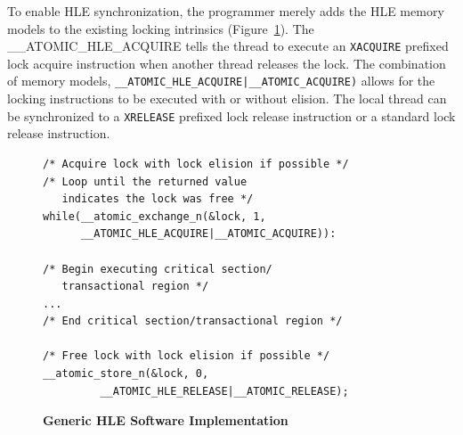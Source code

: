 \documentclass{sig-alternate}
\begin{document}

To enable HLE synchronization, the programmer merely adds the HLE memory models to the
existing locking intrinsics (Figure~\ref{fig:hle_interface}).  The
\_\_ATOMIC\_HLE\_ACQUIRE tells the thread to execute an \texttt{XACQUIRE} prefixed lock
acquire instruction when another thread releases the lock.  The combination of memory
models, \texttt{\_\_ATOMIC\_HLE\_ACQUIRE|\_\_ATOMIC\_ACQUIRE)} allows for the locking
instructions to be executed with or without elision.  The local thread can be synchronized
to a \texttt{XRELEASE} prefixed lock release instruction or a standard lock release
instruction.

\begin{figure}
\begin{verbatim}
/* Acquire lock with lock elision if possible */
/* Loop until the returned value 
   indicates the lock was free */
while(__atomic_exchange_n(&lock, 1, 
      __ATOMIC_HLE_ACQUIRE|__ATOMIC_ACQUIRE)):

/* Begin executing critical section/
   transactional region */
...
/* End critical section/transactional region */

/* Free lock with lock elision if possible */
__atomic_store_n(&lock, 0, 
         __ATOMIC_HLE_RELEASE|__ATOMIC_RELEASE);
\end{verbatim}
    \caption{\textbf{Generic HLE Software Implementation}}\label{fig:hle_interface}
\end{figure}
\end{document}
